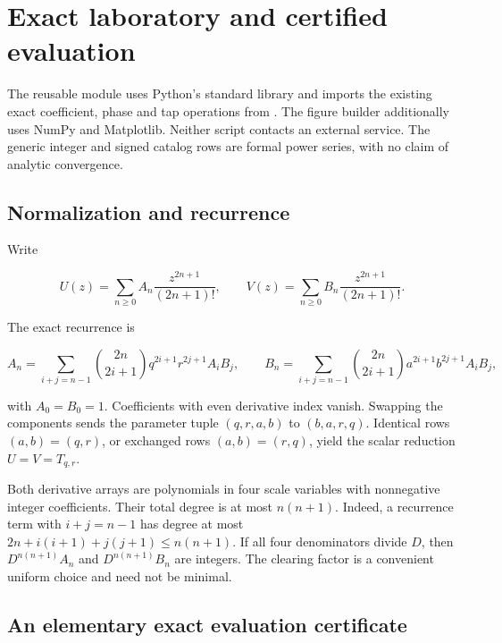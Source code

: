 \hypertarget{v11-coupled_lab_full-exact-laboratory-and-certified-evaluation}{%
\chapter[Exact laboratory and certified evaluation]{Exact laboratory and certified
evaluation}\label{app:laboratory}\label{v11-coupled_lab_full-exact-laboratory-and-certified-evaluation}}

The reusable module  uses Python's standard
library and imports the existing exact coefficient, phase and tap
operations from . The figure builder additionally
uses NumPy and Matplotlib. Neither script contacts an external service.
The generic integer and signed catalog rows are formal power series,
with no claim of analytic convergence.

\hypertarget{v11-coupled_lab_full-normalization-and-recurrence}{%
\section{Normalization and
recurrence}\label{v11-coupled_lab_full-normalization-and-recurrence}}

Write

\[
U(z)=\sum_{n\ge0}A_n\frac{z^{2n+1}}{(2n+1)!},\qquad
V(z)=\sum_{n\ge0}B_n\frac{z^{2n+1}}{(2n+1)!}.
\]

The exact recurrence is

\[
A_n=\sum_{i+j=n-1}\binom{2n}{2i+1}q^{2i+1}r^{2j+1}A_iB_j,
\qquad
B_n=\sum_{i+j=n-1}\binom{2n}{2i+1}a^{2i+1}b^{2j+1}A_iB_j,
\]

with \(A_0=B_0=1\). Coefficients with even derivative index vanish.
Swapping the components sends the parameter tuple \((q,r,a,b)\) to
\((b,a,r,q)\). Identical rows \((a,b)=(q,r)\), or exchanged rows
\((a,b)=(r,q)\), yield the scalar reduction \(U=V=T_{q,r}\).

Both derivative arrays are polynomials in four scale variables with
nonnegative integer coefficients. Their total degree is at most
\(n(n+1)\). Indeed, a recurrence term with \(i+j=n-1\) has degree at
most \(2n+i(i+1)+j(j+1)\le n(n+1)\). If all four denominators divide
\(D\), then \(D^{n(n+1)}A_n\) and \(D^{n(n+1)}B_n\) are integers. The
clearing factor is a convenient uniform choice and need not be minimal.

\hypertarget{v11-coupled_lab_full-an-elementary-exact-evaluation-certificate}{%
\section{An elementary exact evaluation
certificate}\label{v11-coupled_lab_full-an-elementary-exact-evaluation-certificate}}

